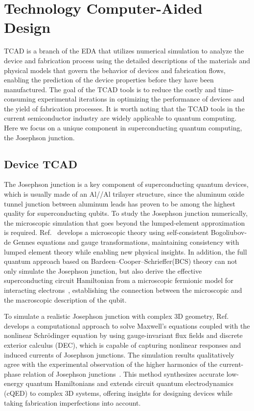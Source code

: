 \documentclass[a4paper,onecolumn,11pt,unpublished]{quantumarticle}
\begin{document}
\section{Technology Computer-Aided Design}
TCAD is a branch of the EDA that utilizes numerical simulation to analyze the device and fabrication process using the detailed descriptions of the materials and physical models that govern the behavior of devices and fabrication flows, enabling the prediction of the device properties before they have been manufactured. The goal of the TCAD tools is to reduce the costly and time-consuming experimental iterations in optimizing the performance of devices and the yield of fabrication processes.  It is worth noting that the TCAD tools in the current semiconductor industry are widely applicable to quantum computing. Here we focus on a unique component in superconducting quantum computing, the Josephson junction.

\subsection{Device TCAD}
The Josephson junction is a key component of superconducting quantum devices, which is usually made of an Al//Al trilayer structure, since the aluminum oxide tunnel junction between aluminum leads has proven to be among the highest quality for superconducting qubits. To study the Josephson junction numerically, the microscopic simulation that goes beyond the lumped-element approximation is required. Ref.~\cite{Mizel2024Theory} develops a microscopic theory using self-consistent Bogoliubov-de Gennes equations and gauge transformations, maintaining consistency with lumped element theory while enabling new physical insights. In addition, the full quantum approach based on Bardeen–Cooper–Schrieffer(BCS) theory can not only simulate the Josephson junction, but also derive the effective superconducting circuit Hamiltonian from a microscopic fermionic model for interacting electrons~\cite{Liao2024Circuit}, establishing the connection between the microscopic and the macroscopic description of the qubit. 

To simulate a realistic Josephson junction with complex 3D geometry, Ref.~\cite{Pham2023Fluxbased} develops a computational approach to solve Maxwell's equations coupled with the nonlinear Schr\"odinger equation by using gauge-invariant flux fields and discrete exterior calculus (DEC), which is capable of capturing nonlinear responses and induced currents of Josephson junctions. 
The simulation results qualitatively agree with the experimental observation of the higher harmonics of the current-phase relation of Josephson junctions~\cite{Willsch2024Observation}.
This method synthesizes accurate low-energy quantum Hamiltonians and extends circuit quantum electrodynamics (cQED) to complex 3D systems, offering insights for designing devices while taking fabrication imperfections into account.
\end{document}
